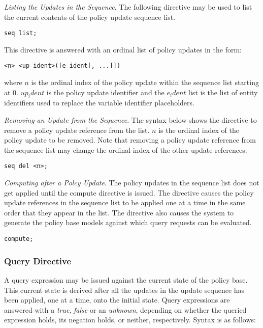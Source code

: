 \documentclass[10pt, twocolumn]{article}
\begin{document}
        \emph{Listing the Updates in the Sequence}. The following directive may
        be used to list the current contents of the policy update sequence
        list.

        \begin{verbatim}seq list;\end{verbatim}

        This directive is answered with an ordinal list of policy updates in
        the form:

        \begin{verbatim}<n> <up_ident>([e_ident[, ...]])\end{verbatim}

        where $n$ is the ordinal index of the policy update within the sequence
        list starting at 0. $up_ident$ is the policy update identifier and the
        $e_ident$ list is the list of entity identifiers used to replace the
        variable identifier placeholders.

        \emph{Removing an Update from the Sequence}. The syntax below shows the
        directive to remove a policy update reference from the list. $n$ is the
        ordinal index of the policy update to be removed. Note that removing
        a policy update reference from the sequence list may change the ordinal
        index of the other update references.

        \begin{verbatim}seq del <n>;\end{verbatim}

      \emph{Computing after a Polcy Update}. The policy updates in the sequence
      list does not get applied until the compute directive is issued. The
      directive causes the policy update references in the sequence list to be
      applied one at a time in the same order that they appear in the list. The
      directive also causes the system to generate the policy base models
      against which query requests can be evaluated.

      \begin{verbatim}compute;\end{verbatim}

      \subsubsection{Query Directive}

        A query expression may be issued against the current state of the
        policy base. This current state is derived after all the updates in
        the update sequence has been applied, one at a time, onto the initial
        state. Query expressions are answered with a \emph{true}, \emph{false}
        or an \emph{unknown}, depending on whether the queried expression
        holds, its negation holds, or neither, respectively. Syntax is as
        follows:
\end{document}

